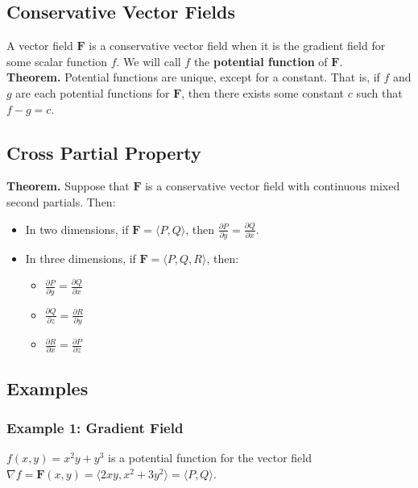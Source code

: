 \subsection{Conservative Vector Fields}
A vector field \( \mathbf{F} \) is a conservative vector field when it is the gradient field for some scalar function \( f \). We will call \( f \) the \textbf{potential function} of \( \mathbf{F} \). \\

\textbf{Theorem.} Potential functions are unique, except for a constant. That is, if \( f \) and \( g \) are each potential functions for \( \mathbf{F} \), then there exists some constant \( c \) such that \( f - g = c \).

\subsection{Cross Partial Property}
\textbf{Theorem.} Suppose that \( \mathbf{F} \) is a conservative vector field with continuous mixed second partials. Then:

\begin{itemize}
    \item In two dimensions, if \( \mathbf{F} = \langle P,Q \rangle \), then \( \frac{\partial P}{\partial y} = \frac{\partial Q}{\partial x} \).
    \item In three dimensions, if \( \mathbf{F} = \langle P, Q, R \rangle \), then:
    \begin{itemize}
        \item \( \frac{\partial P}{\partial y} = \frac{\partial Q}{\partial x} \)
        \item \( \frac{\partial Q}{\partial z} = \frac{\partial R}{\partial y} \)
        \item \( \frac{\partial R}{\partial x} = \frac{\partial P}{\partial z} \)
    \end{itemize}
\end{itemize}

\subsection{Examples}

\subsubsection{Example 1: Gradient Field}

\(f(x,y) = x^{2}y + y^{3}\) is a potential function for the vector field \(\nabla f = \mathbf{F}(x,y) = \langle 2xy, x^{2} + 3y^{2} \rangle = \langle P, Q \rangle\). \\

